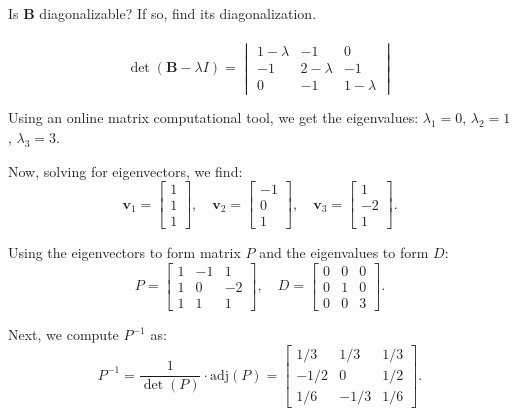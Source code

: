 Is $\textbf{B}$ diagonalizable? If so, find its diagonalization. 
 \\ \\ 
\[
\det(\mathbf{B} - \lambda I) = 
\begin{vmatrix}
1-\lambda & -1 & 0 \\
-1 & 2-\lambda & -1 \\
0 & -1 & 1-\lambda
\end{vmatrix}
\]

Using an online matrix computational tool, we get the eigenvalues: \(\lambda_1 = 0\), \(\lambda_2 = 1\), \(\lambda_3 = 3\).

Now, solving for eigenvectors, we find:
\[
\mathbf{v}_1 = \begin{bmatrix} 1 \\ 1 \\ 1 \end{bmatrix}, \quad
\mathbf{v}_2 = \begin{bmatrix} -1 \\ 0 \\ 1 \end{bmatrix}, \quad
\mathbf{v}_3 = \begin{bmatrix} 1 \\ -2 \\ 1 \end{bmatrix}.
\]

Using the eigenvectors to form matrix \(P\) and the eigenvalues to form \(D\):
\[
P = \begin{bmatrix}
1 & -1 & 1 \\
1 & 0 & -2 \\
1 & 1 & 1
\end{bmatrix}, \quad
D = \begin{bmatrix}
0 & 0 & 0 \\
0 & 1 & 0 \\
0 & 0 & 3
\end{bmatrix}.
\]

Next, we compute \(P^{-1}\) as:
\[
P^{-1} = \frac{1}{\det(P)} \cdot \text{adj}(P) = \begin{bmatrix}
1/3 & 1/3 & 1/3 \\
-1/2 & 0 & 1/2 \\
1/6 & -1/3 & 1/6
\end{bmatrix}.
\]

